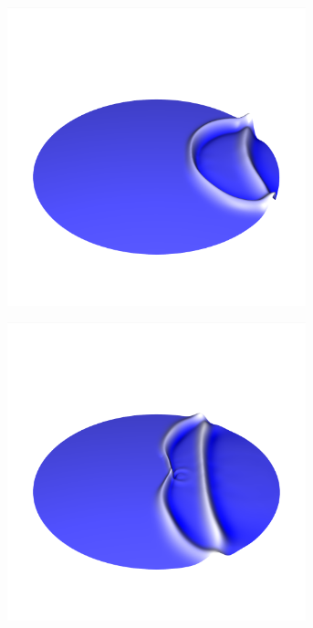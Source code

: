 \documentclass[crop=false,10pt,ngerman]{standalone}
\begin{document}
\begin{figure}[h]
\begin{subfigure}[b]{0.24\textwidth}
          \caption{}
        \end{subfigure}
        \begin{subfigure}[b]{0.24\textwidth}
          \center
          \includegraphics[trim={1.5cm 3.05cm 1.5cm 5.2cm},clip,width=0.95\textwidth]{images/circle_wave_2.png}
          \caption{}
        \end{subfigure}
        \begin{subfigure}[b]{0.24\textwidth}
          \center
          \includegraphics[trim={1.5cm 3.05cm 1.5cm 5.2cm},clip,width=0.95\textwidth]{images/circle_wave_3.png}
          \caption{}
        \end{subfigure}


\end{figure}
\end{document}
